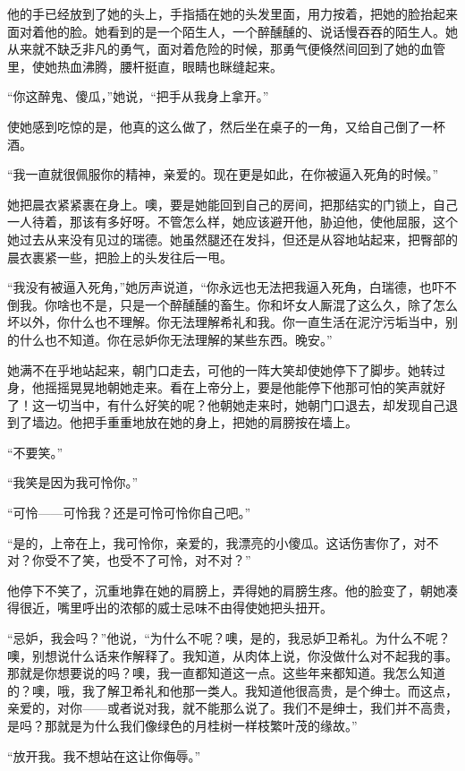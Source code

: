 \par 他的手已经放到了她的头上，手指插在她的头发里面，用力按着，把她的脸抬起来面对着他的脸。她看到的是一个陌生人，一个醉醺醺的、说话慢吞吞的陌生人。她从来就不缺乏非凡的勇气，面对着危险的时候，那勇气便倏然间回到了她的血管里，使她热血沸腾，腰杆挺直，眼睛也眯缝起来。
\par “你这醉鬼、傻瓜，”她说，“把手从我身上拿开。”
\par 使她感到吃惊的是，他真的这么做了，然后坐在桌子的一角，又给自己倒了一杯酒。
\par “我一直就很佩服你的精神，亲爱的。现在更是如此，在你被逼入死角的时候。”
\par 她把晨衣紧紧裹在身上。噢，要是她能回到自己的房间，把那结实的门锁上，自己一人待着，那该有多好呀。不管怎么样，她应该避开他，胁迫他，使他屈服，这个她过去从来没有见过的瑞德。她虽然腿还在发抖，但还是从容地站起来，把臀部的晨衣裹紧一些，把脸上的头发往后一甩。
\par “我没有被逼入死角，”她厉声说道，“你永远也无法把我逼入死角，白瑞德，也吓不倒我。你啥也不是，只是一个醉醺醺的畜生。你和坏女人厮混了这么久，除了怎么坏以外，你什么也不理解。你无法理解希礼和我。你一直生活在泥泞污垢当中，别的什么也不知道。你在忌妒你无法理解的某些东西。晚安。”
\par 她满不在乎地站起来，朝门口走去，可他的一阵大笑却使她停下了脚步。她转过身，他摇摇晃晃地朝她走来。看在上帝分上，要是他能停下他那可怕的笑声就好了！这一切当中，有什么好笑的呢？他朝她走来时，她朝门口退去，却发现自己退到了墙边。他把手重重地放在她的身上，把她的肩膀按在墙上。
\par “不要笑。”
\par “我笑是因为我可怜你。”
\par “可怜——可怜我？还是可怜可怜你自己吧。”
\par “是的，上帝在上，我可怜你，亲爱的，我漂亮的小傻瓜。这话伤害你了，对不对？你受不了笑，也受不了可怜，对不对？”
\par 他停下不笑了，沉重地靠在她的肩膀上，弄得她的肩膀生疼。他的脸变了，朝她凑得很近，嘴里呼出的浓郁的威士忌味不由得使她把头扭开。
\par “忌妒，我会吗？”他说，“为什么不呢？噢，是的，我忌妒卫希礼。为什么不呢？噢，别想说什么话来作解释了。我知道，从肉体上说，你没做什么对不起我的事。那就是你想要说的吗？噢，我一直都知道这一点。这些年来都知道。我怎么知道的？噢，哦，我了解卫希礼和他那一类人。我知道他很高贵，是个绅士。而这点，亲爱的，对你——或者说对我，就不能那么说了。我们不是绅士，我们并不高贵，是吗？那就是为什么我们像绿色的月桂树一样枝繁叶茂的缘故。”
\par “放开我。我不想站在这让你侮辱。”
